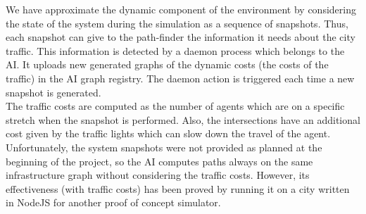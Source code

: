 
We have approximate the dynamic component of the environment by considering
the state of the system during the simulation as a sequence of snapshots.
Thus, each snapshot can give to the path-finder the information it needs
about the city traffic.
This information is detected by a daemon process which belongs to the AI.
It uploads new generated graphs of the dynamic costs (the costs of the traffic)
in the AI graph registry. The daemon action is triggered each time a new
snapshot is generated.
\\

The traffic costs are computed as the number of agents which are on a specific
stretch when the snapshot is performed. Also, the intersections have an additional
cost given by the traffic lights which can slow down the travel of the agent.
\\

Unfortunately, the system
snapshots were not provided as planned at the beginning of the project, so
the AI computes paths always on the same infrastructure graph without
considering the traffic costs. However, its effectiveness (with traffic costs)
has been proved by running it on a city written in NodeJS for another
proof of concept simulator.
